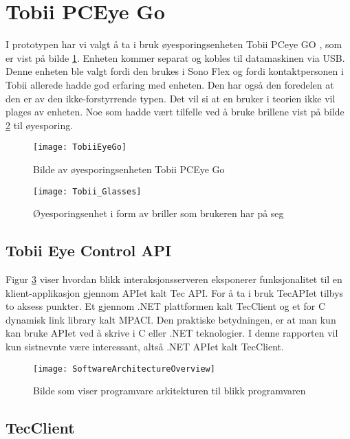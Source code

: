 \section{Tobii PCEye Go}

I prototypen har vi valgt å ta i bruk øyesporingsenheten Tobii PCeye GO \cite{Contr4:online}, som er vist på bilde \ref{fig:tobiiPc}. Enheten kommer separat og kobles til datamaskinen via USB. Denne enheten ble valgt fordi den brukes i Sono Flex og fordi kontaktpersonen i Tobii allerede hadde god erfaring med enheten. Den har også den foredelen at den er av den ikke-forstyrrende typen. Det vil si at en bruker i teorien ikke vil plages av enheten. Noe som hadde vært tilfelle ved å bruke brillene vist på bilde \ref{fig:tobii_glasses} til øyesporing.


\begin{figure}[ht!]
\centering
\texttt{[image: TobiiEyeGo]}
\caption{Bilde av øyesporingsenheten Tobii PCEye Go}
\label{fig:tobiiPc}
\end{figure}

\begin{figure}[ht!]
\centering
\texttt{[image: Tobii\_Glasses]}
\caption{Øyesporingsenhet i form av briller som brukeren har på seg}
\label{fig:tobii_glasses}
\end{figure}


\subsection{Tobii Eye Control API }

Figur \ref{fig:overview} viser hvordan blikk interaksjonsserveren eksponerer funksjonalitet til en klient-applikasjon gjennom APIet kalt Tec API. For å ta i bruk TecAPIet tilbys to aksess punkter. Et gjennom .NET plattformen kalt TecClient og et for C dynamisk link library kalt MPACI.  Den praktiske betydningen, er at man kun kan bruke APIet ved å skrive i C eller .NET teknologier. I denne rapporten vil kun sistnevnte være interessant, altså .NET APIet kalt TecClient.


\begin{figure}[ht!]
\centering
\texttt{[image: SoftwareArchitectureOverview]}
\caption{Bilde som viser programvare arkitekturen til blikk programvaren}
\label{fig:overview}
\end{figure}


\subsection{TecClient}

